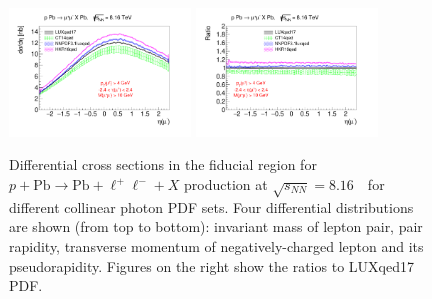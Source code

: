 \begin{figure}[]
\includegraphics[width=0.43\textwidth]{figures/etal_inc_cut.pdf}
\includegraphics[width=0.43\textwidth]{figures/Ratioetal_inc_cut.pdf}
\caption{Differential cross sections in the fiducial region for $p+\textrm{Pb}\rightarrow \textrm{Pb} + \ell^+\ell^- + X$ production at $\sqrt{s_{N N}} = 8.16$~\TeV\ for different collinear photon PDF sets.
Four differential distributions are shown (from top to bottom): invariant mass of lepton pair, pair rapidity, transverse momentum of negatively-charged lepton and its pseudorapidity. Figures on the right show the ratios to LUXqed17 PDF.}
\label{fig:inc_cut}
\end{figure}






